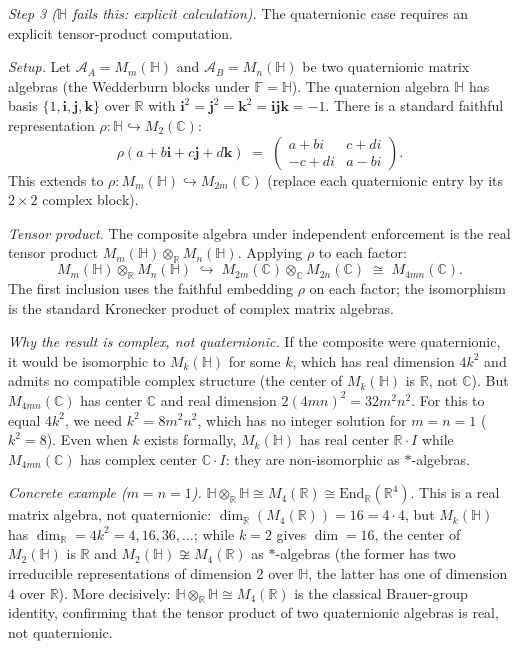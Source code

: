 \documentclass[11pt]{article}
\theoremstyle{remark}
\begin{document}
\begin{tcolorbox}[apfbox, title={$P_{\mathrm{cls}}$: Compositional Closure}]
\textit{Step 3 ($\mathbb{H}$ fails this: explicit calculation).}  The quaternionic case requires an explicit tensor-product computation.

\textit{Setup.}  Let $\mathcal{A}_A = M_m(\mathbb{H})$ and $\mathcal{A}_B = M_n(\mathbb{H})$ be two quaternionic matrix algebras (the Wedderburn blocks under $\mathbb{F} = \mathbb{H}$).  The quaternion algebra $\mathbb{H}$ has basis $\{1, \mathbf{i}, \mathbf{j}, \mathbf{k}\}$ over $\mathbb{R}$ with $\mathbf{i}^2 = \mathbf{j}^2 = \mathbf{k}^2 = \mathbf{ijk} = -1$.  There is a standard faithful representation $\rho: \mathbb{H} \hookrightarrow M_2(\mathbb{C})$:
\[
\rho(a + b\mathbf{i} + c\mathbf{j} + d\mathbf{k}) \;=\; \begin{pmatrix} a + bi & c + di \\ -c + di & a - bi \end{pmatrix}.
\]
This extends to $\rho: M_m(\mathbb{H}) \hookrightarrow M_{2m}(\mathbb{C})$ (replace each quaternionic entry by its $2 \times 2$ complex block).

\textit{Tensor product.}  The composite algebra under independent enforcement is the real tensor product $M_m(\mathbb{H}) \otimes_\mathbb{R} M_n(\mathbb{H})$.  Applying $\rho$ to each factor:
\[
M_m(\mathbb{H}) \otimes_\mathbb{R} M_n(\mathbb{H}) \;\hookrightarrow\; M_{2m}(\mathbb{C}) \otimes_\mathbb{C} M_{2n}(\mathbb{C}) \;\cong\; M_{4mn}(\mathbb{C}).
\]
The first inclusion uses the faithful embedding $\rho$ on each factor; the isomorphism is the standard Kronecker product of complex matrix algebras.

\textit{Why the result is complex, not quaternionic.}  If the composite were quaternionic, it would be isomorphic to $M_k(\mathbb{H})$ for some $k$, which has real dimension $4k^2$ and admits no compatible complex structure (the center of $M_k(\mathbb{H})$ is $\mathbb{R}$, not $\mathbb{C}$).  But $M_{4mn}(\mathbb{C})$ has center $\mathbb{C}$ and real dimension $2(4mn)^2 = 32m^2n^2$.  For this to equal $4k^2$, we need $k^2 = 8m^2n^2$, which has no integer solution for $m = n = 1$ ($k^2 = 8$).  Even when $k$ exists formally, $M_k(\mathbb{H})$ has real center $\mathbb{R} \cdot I$ while $M_{4mn}(\mathbb{C})$ has complex center $\mathbb{C} \cdot I$: they are non-isomorphic as $*$-algebras.

\textit{Concrete example ($m = n = 1$).}  $\mathbb{H} \otimes_\mathbb{R} \mathbb{H} \cong M_4(\mathbb{R}) \cong \mathrm{End}_\mathbb{R}(\mathbb{R}^4)$.  This is a real matrix algebra, not quaternionic: $\dim_\mathbb{R}(M_4(\mathbb{R})) = 16 = 4 \cdot 4$, but $M_k(\mathbb{H})$ has $\dim_\mathbb{R} = 4k^2 = 4, 16, 36, \ldots$; while $k = 2$ gives $\dim = 16$, the center of $M_2(\mathbb{H})$ is $\mathbb{R}$ and $M_2(\mathbb{H}) \not\cong M_4(\mathbb{R})$ as $*$-algebras (the former has two irreducible representations of dimension 2 over $\mathbb{H}$, the latter has one of dimension 4 over $\mathbb{R}$).  More decisively: $\mathbb{H} \otimes_\mathbb{R} \mathbb{H} \cong M_4(\mathbb{R})$ is the classical Brauer-group identity, confirming that the tensor product of two quaternionic algebras is real, not quaternionic.


\end{tcolorbox}
\end{document}
